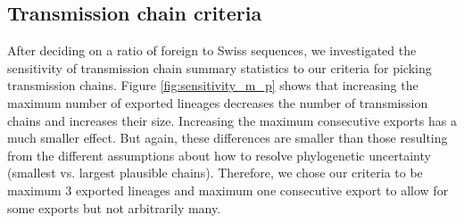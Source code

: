 \documentclass[9pt,twoside,lineno]{pnas-new}
\begin{document}
\subsection{Transmission chain criteria}
After deciding on a ratio of foreign to Swiss sequences, we investigated the sensitivity of transmission chain summary statistics to our criteria for picking transmission chains. Figure \ref{fig:sensitivity_m_p} shows that increasing the maximum number of exported lineages decreases the number of transmission chains and increases their size. Increasing the maximum consecutive exports has a much smaller effect. But again, these differences are smaller than those resulting from the different assumptions about how to resolve phylogenetic uncertainty (smallest vs. largest plausible chains). Therefore, we chose our criteria to be maximum 3 exported lineages and maximum one consecutive export to allow for some exports but not arbitrarily many. 



\end{document}
